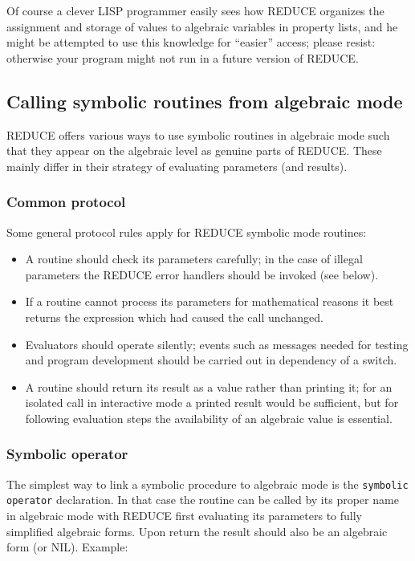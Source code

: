 \documentclass[11pt]{article}
\makeatletter
\newcommand{\reduce}{\small REDUCE}
\newcommand{\ttindex}[1]{\index{#1@{\texttt{#1}}}}
\makeatother
\begin{document}
Of course a clever LISP programmer easily sees how {\reduce}
organizes the assignment and storage of values to algebraic variables
in property lists, and he might be attempted
to use this knowledge for ``easier'' access; please resist:
otherwise your program might not run in a future
version of {\reduce}.


\subsection{Calling symbolic routines from algebraic mode}

{\reduce} offers various ways to use symbolic routines
in algebraic mode such that they appear on the
algebraic level as genuine parts of {\reduce}.
These mainly differ in their strategy of evaluating parameters
(and results).

\subsubsection{Common protocol}

Some general protocol rules apply for {\reduce} symbolic mode
routines:
\begin{itemize}
\item A routine should check its parameters carefully; in
  the case of illegal parameters the {\reduce} error handlers
  should be invoked (see below).
\item If a routine cannot process its parameters for mathematical
  reasons it best returns the expression which had caused the call
  unchanged.
\item Evaluators should operate silently; events such as messages needed
  for testing and program development should be carried out in
  dependency of a switch.
\item A routine should return its result as a value
  rather than printing it; for an isolated call in interactive
  mode a printed result would be sufficient, but for following evaluation
  steps the availability of an algebraic value is essential.
\end{itemize}

\subsubsection{Symbolic operator}

The simplest way to link a symbolic procedure to algebraic
mode is the \texttt{symbolic operator}\ttindex{symbolic operator} declaration.
In that case the routine can be called by its proper name in algebraic
mode with {\reduce} first evaluating its parameters to fully
simplified algebraic forms. Upon return the result
should also be an algebraic form (or NIL). Example:
\end{document}
